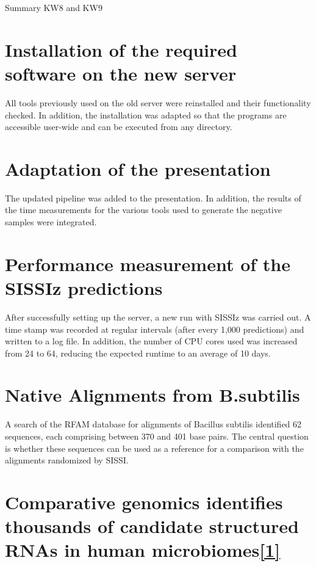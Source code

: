 \documentclass{article}
\begin{document}
\begin{large}
\begin{large}
\begin{large}
Summary KW8 and KW9

\section{Installation of the required software on the new server}

All tools previously used on the old server were reinstalled and their functionality checked. In addition, the installation was adapted so that the programs are accessible user-wide and can be executed from any directory.

\section{Adaptation of the presentation}

The updated pipeline was added to the presentation. In addition, the results of the time measurements for the various tools used to generate the negative samples were integrated.

\section{Performance measurement of the SISSIz predictions }

After successfully setting up the server, a new run with SISSIz was carried out. A time stamp was recorded at regular intervals (after every 1,000 predictions) and written to a log file. In addition, the number of CPU cores used was increased from 24 to 64, reducing the expected runtime to an average of 10 days.

\section{Native Alignments from B.subtilis}

A search of the RFAM database for alignments of Bacillus subtilis identified 62 sequences, each comprising between 370 and 401 base pairs. The central question is whether these sequences can be used as a reference for a comparison with the alignments randomized by SISSI.

\clearpage

\section{Comparative genomics identifies thousands of candidate structured RNAs in human microbiomes\href{https://pubmed.ncbi.nlm.nih.gov/33845850/}{\textbf{[1]}}}


\end{large}
\end{large}
\end{large}
\end{document}
